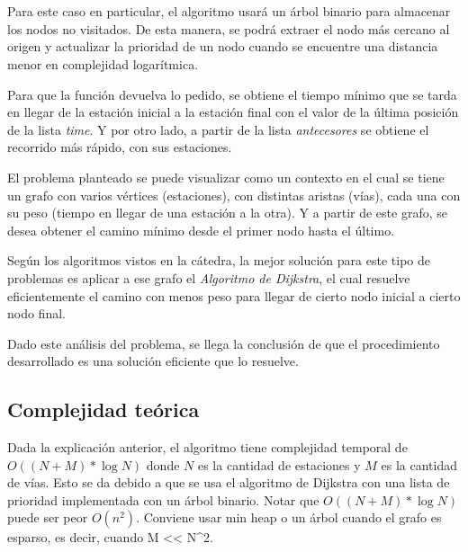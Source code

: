      \\~\\
    
    \par  Para este caso en particular, el algoritmo usará un árbol binario para almacenar los nodos no visitados. De esta manera, se podrá extraer el nodo más cercano al origen y actualizar la prioridad de un nodo cuando se encuentre una distancia menor en complejidad logarítmica.
    \par Para que la función devuelva lo pedido, se obtiene el tiempo mínimo que se tarda en llegar de la estación inicial a la estación final con el valor de la última posición de la lista \emph{time}. Y por otro lado, a partir de la lista \emph{antecesores} se obtiene el recorrido más rápido, con sus estaciones.

    \par El problema planteado se puede visualizar como un contexto en el cual se tiene un grafo con varios vértices (estaciones), con distintas aristas (vías), cada una con su peso (tiempo en llegar de una estación a la otra). Y a partir de este grafo, se desea obtener el camino mínimo desde el primer nodo hasta el último.
    \par Según los algoritmos vistos en la cátedra, la mejor solución para este tipo de problemas es aplicar a ese grafo el \emph{Algoritmo de Dijkstra}, el cual resuelve eficientemente el camino con menos peso para llegar de cierto nodo inicial a cierto nodo final.
    \par Dado este análisis del problema, se llega la conclusión de que el procedimiento desarrollado es una solución eficiente que lo resuelve.
   
    \subsection{Complejidad teórica}
        Dada la explicación anterior, el algoritmo tiene complejidad temporal de $O((N+M) * \log N)$ donde $N$ es la cantidad de estaciones y $M$ es la cantidad de vías.
        Esto se da debido a que se usa el algoritmo de Dijkstra con una lista de prioridad implementada con un árbol binario.
        Notar que $O((N+M) * \log N)$ puede ser peor $O(n^{2})$. Conviene usar min heap o un árbol cuando el grafo es esparso, es decir, cuando M << N^{2}.
    



